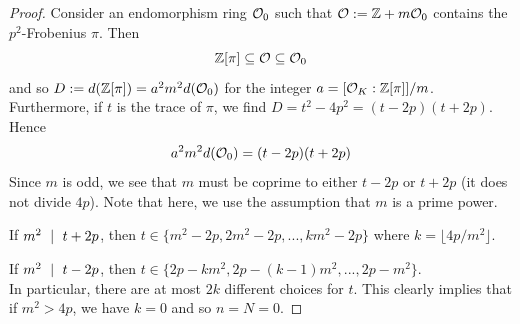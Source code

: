 \begin{proof}
    Consider an endomorphism ring $\mathcal{O}_0$ such that $\mathcal{O} := \mathbb{Z} + m\mathcal{O}_0$ contains the $p^2$-Frobenius $\pi$.
    Then
    \begin{equation*}
        \mathbb{Z}[\pi] \subseteq \mathcal{O} \subseteq \mathcal{O}_0
    \end{equation*}
    and so $D := d(\mathbb{Z}[\pi]) = a^2m^2d(\mathcal{O}_0)$ for the integer $a = [\mathcal{O}_K : \mathbb{Z}[\pi]] / m$.
    Furthermore, if $t$ is the trace of $\pi$, we find $D = t^2 - 4p^2 = (t - 2p)(t + 2p)$.
    Hence
    \begin{equation*}
        a^2m^2d(\mathcal{O}_0) = (t - 2p)(t + 2p)
    \end{equation*}
    Since $m$ is odd, we see that $m$ must be coprime to either $t - 2p$ or $t + 2p$ (it does not divide $4p$).
    Note that here, we use the assumption that $m$ is a prime power.

    If $m^2 \ \mid \  t + 2p$, then $t \in \{ m^2 - 2p, 2m^2 - 2p, ..., km^2 - 2p \}$ where $k = \lfloor 4p/m^2 \rfloor$.

    If $m^2 \ \mid \  t - 2p$, then $t \in \{ 2p - km^2, 2p - (k - 1)m^2, ..., 2p - m^2 \}$.
    \\
    In particular, there are at most $2k$ different choices for $t$.
    This clearly implies that if $m^2 > 4p$, we have $k = 0$ and so $n = N = 0$.


\end{proof}
